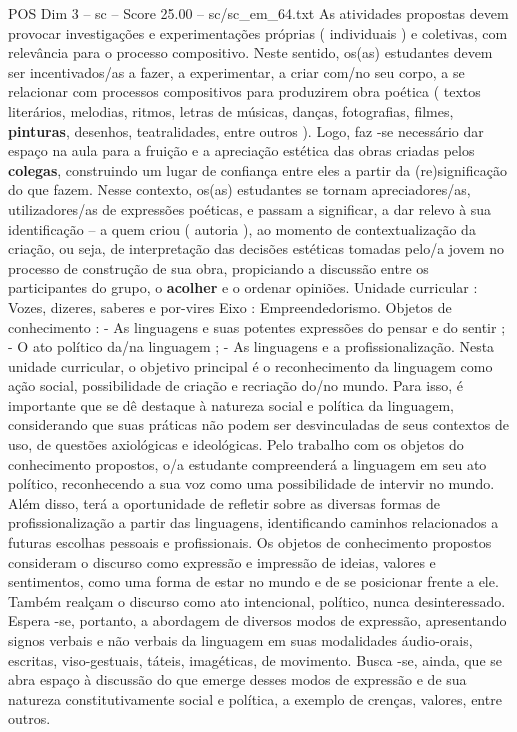 \begin{textsample}{POS Dim 3 – sc – Score 25.00 – sc/sc\_em\_64.txt}
As atividades propostas devem provocar investigações e experimentações próprias ( individuais ) e coletivas, com relevância para o processo compositivo.
Neste sentido, os(as) estudantes devem ser incentivados/as a fazer, a experimentar, a criar com/no seu corpo, a se relacionar com processos compositivos para produzirem obra poética ( textos literários, melodias, ritmos, letras de músicas, danças, fotografias, filmes, \textbf{pinturas}, desenhos, teatralidades, entre outros ).
Logo, faz -se necessário dar espaço na aula para a fruição e a apreciação estética das obras criadas pelos \textbf{colegas}, construindo um lugar de confiança entre eles a partir da (re)significação do que fazem.
Nesse contexto, os(as) estudantes se tornam apreciadores/as, utilizadores/as de expressões poéticas, e passam a significar, a dar relevo à sua identificação – a quem criou ( autoria ), ao momento de contextualização da criação, ou seja, de interpretação das decisões estéticas tomadas pelo/a jovem no processo de construção de sua obra, propiciando a discussão entre os participantes do grupo, o \textbf{acolher} e o ordenar opiniões.
Unidade curricular : Vozes, dizeres, saberes e por-vires Eixo : Empreendedorismo.
Objetos de conhecimento : - As linguagens e suas potentes expressões do pensar e do sentir ; - O ato político da/na linguagem ; - As linguagens e a profissionalização.
Nesta unidade curricular, o objetivo principal é o reconhecimento da linguagem como ação social, possibilidade de criação e recriação do/no mundo.
Para isso, é importante que se dê destaque à natureza social e política da linguagem, considerando que suas práticas não podem ser desvinculadas de seus contextos de uso, de questões axiológicas e ideológicas.
Pelo trabalho com os objetos do conhecimento propostos, o/a estudante compreenderá a linguagem em seu ato político, reconhecendo a sua voz como uma possibilidade de intervir no mundo.
Além disso, terá a oportunidade de refletir sobre as diversas formas de profissionalização a partir das linguagens, identificando caminhos relacionados a futuras escolhas pessoais e profissionais.
Os objetos de conhecimento propostos consideram o discurso como expressão e impressão de ideias, valores e sentimentos, como uma forma de estar no mundo e de se posicionar frente a ele.
Também realçam o discurso como ato intencional, político, nunca desinteressado.
Espera -se, portanto, a abordagem de diversos modos de expressão, apresentando signos verbais e não verbais da linguagem em suas modalidades áudio-orais, escritas, viso-gestuais, táteis, imagéticas, de movimento.
Busca -se, ainda, que se abra espaço à discussão do que emerge desses modos de expressão e de sua natureza constitutivamente social e política, a exemplo de crenças, valores, entre outros.

\end{textsample}
